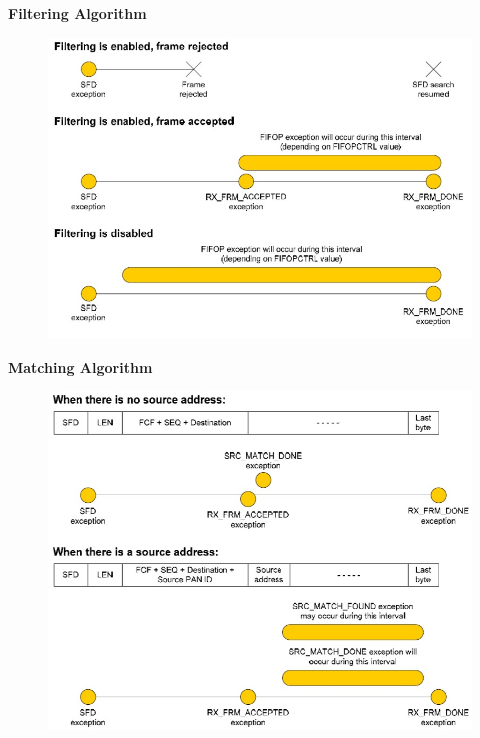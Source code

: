 \documentclass[aspectratio=169]{beamer}
\begin{document}
\begin{frame}{\textbf{Filtering Algorithm}}

	\begin{figure}[H]
		\includegraphics[height=1\textheight]{./imagenes/filtering.jpg}
	\end{figure}	

\end{frame}


\begin{frame}{\textbf{Matching Algorithm}}

	\begin{figure}[H]
		\includegraphics[height=1\textheight]{./imagenes/matching.jpg}
	\end{figure}	

\end{frame}
\end{document}
